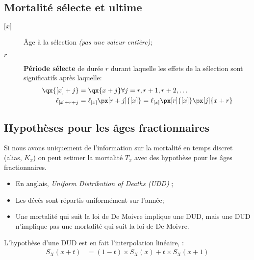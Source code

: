 \documentclass[10pt, french]{article}
\begin{document}
\begin{multicols*}{3}
\subsection{Mortalité sélecte et ultime}
\begin{distributions}[Notation]
\begin{description}
	\item[${[}x{]}$]	Âge à la sélection \textit{(pas une valeur entière)};
	\item[$r$]	\textbf{Période sélecte} de durée $r$ durant laquelle les effets de la sélection sont significatifs après laquelle:
		\begin{align*}
		\qx{[x] + j} 
		&= \qx{x + j} \forall j = r, r + 1, r + 2, \dots	\\
		\ell_{[x] + r + j} 
		&= \ell_{[x]} \px[r + j]{[x]} = \ell_{[x]} \px[r]{[x]} \px[j]{x + r}
		\end{align*}
\end{description}
\end{distributions}

\columnbreak
\subsection{Hypothèses pour les âges fractionnaires}
Si nous avons uniquement de l'information sur la mortalité en temps discret (alias, $K_{x}$) on peut estimer la mortalité $T_x$ avec des hypothèse pour les âges fractionnaires.\\


\begin{definitionNOHFILL}
\begin{itemize}[leftmargin = *]
	\item	En anglais, \og \textit{Uniform Distribution of Deaths (UDD)} \fg{};
	\item	Les décès sont répartis uniformément sur l'année;
	\item	Une mortalité qui suit la loi de De Moivre implique une DUD, mais une DUD n'implique pas une mortalité qui suit la loi de De Moivre.
\end{itemize}
\tcbline
L'hypothèse d'une DUD est en fait l'interpolation linéaire, :
\begin{align*}
	S_{X}(x + t) 
	&=	(1 - t) \times S_X(x) + t \times S_X(x + 1)	\\
\end{align*}


\end{definitionNOHFILL}
\end{multicols*}
\end{document}
